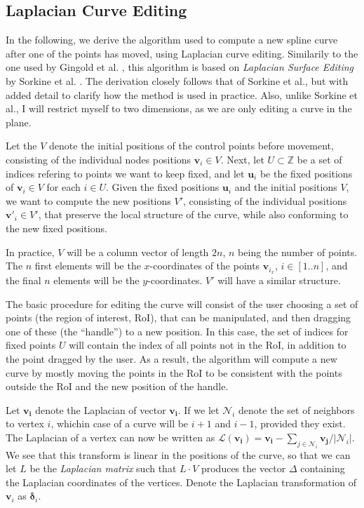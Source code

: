\documentclass[english]{article}
\begin{document}
\subsection{Laplacian Curve Editing} \label{section_laplacian}

In the following, we derive the algorithm used to compute a new spline curve after one of the points has moved, using Laplacian curve editing. Similarily to the one used by Gingold et al. \cite{gingold09}, this algorithm is based on \textit{Laplacian Surface Editing} by Sorkine et al. \cite{sorkine04}. The derivation closely follows that of Sorkine et al., but with added detail to clarify how the method is used in practice. Also, unlike Sorkine et al., I will restrict myself to two dimensions, as we are only editing a curve in the plane.

Let the $V$ denote the initial positions of the control points before movement, consisting of the individual nodes positions $\mathbf{v}_i \in V$. Next, let $U \subset \mathbb{Z}$ be a set of indices refering to points we want to keep fixed, and let $\mathbf{u}_i$ be the fixed positions of $\mathbf{v}_i \in V$ for each $ i \in U$. Given the fixed positions $\mathbf{u}_i$ and the initial positions $V$, we want to compute the new positions $V'$, consisting of the individual positions $\mathbf{v}'_i \in V'$, that preserve the local structure of the curve, while also conforming to the new fixed positions.

In practice, $V$ will be a column vector of length $2n$, $n$ being the number of points. The $n$ first elements will be the $x$-coordinates of the points $\mathbf{v}_{i_x}$, $i \in [1..n]$, and the final $n$ elements will be the $y$-coordinates. $V'$ will have a similar structure.

The basic procedure for editing the curve will consist of the user choosing a set of points (the region of interest, RoI), that can be manipulated, and then dragging one of these (the ``handle'') to a new position. In this case, the set of indices for fixed points $U$ will contain the index of all points not in the RoI, in addition to the point dragged by the user. As a result, the algorithm will compute a new curve by mostly moving the points in the RoI to be consistent with the points outside the RoI and the new position of the handle.

Let $\mathcal{\mathbf{v_i}}$ denote the Laplacian of vector $\mathbf{v_i}$. If we let $\mathcal{N}_i$ denote the set of neighbors to vertex $i$, whichin case of a curve  will be $i+1$ and $i - 1$, provided they exist. The Laplacian of a vertex can now be written as $\mathcal{L}(\mathbf{v_i}) = \mathbf{v_i} - \sum_{j \in \mathcal{N}_i}\mathbf{v_j} / |\mathcal{N}_i|$. We see that this transform is linear in the positions of the curve, so that we can let $L$ be the \textit{Laplacian matrix} such that $L\cdot V$ produces the vector $\Delta$ containing the Laplacian coordinates of the vertices. Denote the Laplacian transformation of $\mathbf{v}_i$ as $\mathbf{\delta}_i$.
\end{document}
